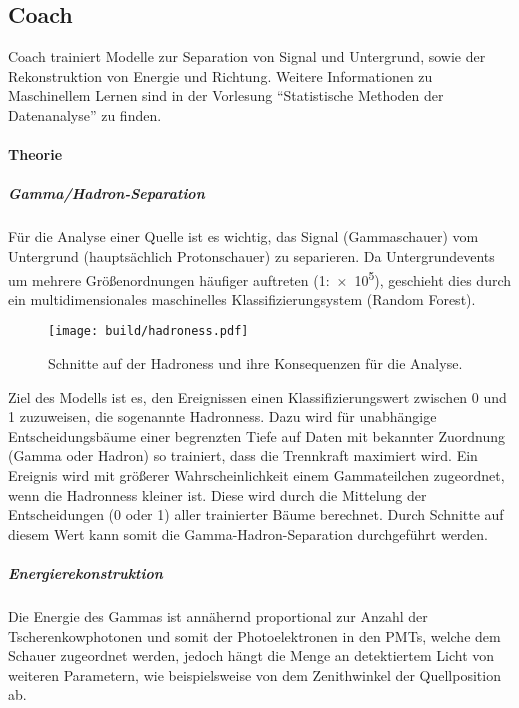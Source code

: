 \subsection{Coach}%
\label{sub:coach}

Coach trainiert Modelle zur Separation von Signal und Untergrund,
sowie der Rekonstruktion von Energie und Richtung.
Weitere Informationen zu Maschinellem Lernen sind in der Vorlesung
\enquote{Statistische Methoden der Datenanalyse} zu finden.

\paragraph{Theorie}%

\subparagraph{Gamma/Hadron-Separation}
Für die Analyse einer Quelle ist es wichtig,
das Signal (Gammaschauer) vom
Untergrund (hauptsächlich Protonschauer) zu separieren.
Da Untergrundevents um mehrere Größenordnungen häufiger auftreten (1:\num{e5}),
geschieht dies durch ein multidimensionales maschinelles
Klassifizierungsystem (Random Forest).

\begin{wrapfigure}[17]{L}{0.55\textwidth}
  \centering
  \texttt{[image: build/hadroness.pdf]}
  \caption{Schnitte auf der Hadroness und ihre Konsequenzen für die Analyse.}%
  \label{fig:uebersicht}
\end{wrapfigure}

Ziel des Modells ist es,
den Ereignissen einen Klassifizierungswert zwischen 0 und 1 zuzuweisen,
die sogenannte Hadronness.
Dazu wird für unabhängige Entscheidungsbäume einer begrenzten Tiefe
auf Daten mit bekannter Zuordnung (Gamma oder Hadron) so trainiert, dass die
Trennkraft maximiert wird.
Ein Ereignis wird mit größerer Wahrscheinlichkeit einem
Gammateilchen zugeordnet, wenn die Hadronness kleiner ist.
Diese wird durch die Mittelung der Entscheidungen (0 oder 1) aller trainierter
Bäume berechnet.
Durch Schnitte auf diesem Wert kann somit die Gamma-Hadron-Separation durchgeführt werden.

\subparagraph{Energierekonstruktion}%
\label{par:energie}

Die Energie des Gammas ist annähernd proportional
zur Anzahl der Tscherenkowphotonen
und somit der Photoelektronen
in den PMTs, welche dem Schauer zugeordnet werden,
jedoch hängt die Menge an detektiertem Licht von weiteren Parametern,
wie beispielsweise von dem Zenithwinkel der Quellposition ab.

